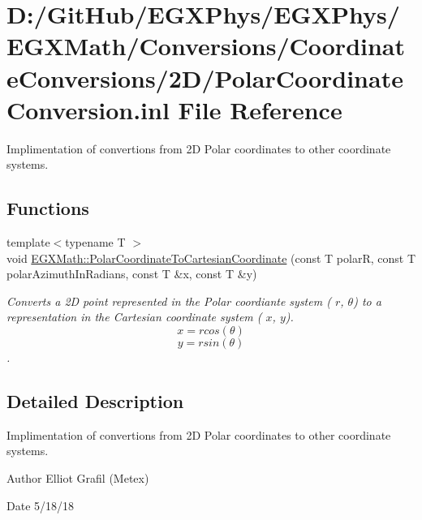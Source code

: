 \hypertarget{_polar_coordinate_conversion_8inl}{}\section{D\+:/\+Git\+Hub/\+E\+G\+X\+Phys/\+E\+G\+X\+Phys/\+E\+G\+X\+Math/\+Conversions/\+Coordinate\+Conversions/2\+D/\+Polar\+Coordinate\+Conversion.inl File Reference}
\label{_polar_coordinate_conversion_8inl}


Implimentation of convertions from 2D Polar coordinates to other coordinate systems.  


\subsection*{Functions}
\begin{DoxyCompactItemize}
\item 
{\footnotesize template$<$typename T $>$ }\\void \mbox{\hyperlink{group___e_g_x_math-_conversions-_coordinate_conversions-2_d-_polar_ga189458efd604828d5825a8e8929845eb}{E\+G\+X\+Math\+::\+Polar\+Coordinate\+To\+Cartesian\+Coordinate}} (const T polarR, const T polar\+Azimuth\+In\+Radians, const T \&x, const T \&y)
\begin{DoxyCompactList}\small\item\em Converts a 2D point represented in the Polar coordiante system ( $r$, $\theta$) to a representation in the Cartesian coordinate system ( $x$, $y$). \[ x = r cos(\theta) \] \[ y = r sin(\theta) \]. \end{DoxyCompactList}\end{DoxyCompactItemize}


\subsection{Detailed Description}
Implimentation of convertions from 2D Polar coordinates to other coordinate systems. 

\begin{DoxyAuthor}{Author}
Elliot Grafil (Metex) 
\end{DoxyAuthor}
\begin{DoxyDate}{Date}
5/18/18 
\end{DoxyDate}
